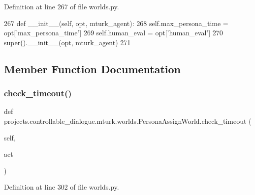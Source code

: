 Definition at line 267 of file worlds.\+py.


\begin{DoxyCode}
267     \textcolor{keyword}{def }\_\_init\_\_(self, opt, mturk\_agent):
268         self.max\_persona\_time = opt[\textcolor{stringliteral}{'max\_persona\_time'}]
269         self.human\_eval = opt[\textcolor{stringliteral}{'human\_eval'}]
270         super().\_\_init\_\_(opt, mturk\_agent)
271 
\end{DoxyCode}


\subsection{Member Function Documentation}
\mbox{\label{classprojects_1_1controllable__dialogue_1_1mturk_1_1worlds_1_1PersonaAssignWorld_acfc25a9685b1b254a2308304cc413723}} 
\subsubsection{\texorpdfstring{check\+\_\+timeout()}{check\_timeout()}}
{\footnotesize\ttfamily def projects.\+controllable\+\_\+dialogue.\+mturk.\+worlds.\+Persona\+Assign\+World.\+check\+\_\+timeout (\begin{DoxyParamCaption}\item[{}]{self,  }\item[{}]{act }\end{DoxyParamCaption})}



Definition at line 302 of file worlds.\+py.


